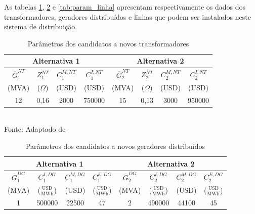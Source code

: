 As tabelas \ref{tab:param_trafo}, \ref{tab:param_dg} e \ref{tab:param_linha} apresentam respectivamente os dados dos transformadores, geradores distribuídos e linhas que podem ser instalados neste sistema de distribuição.
\begin{table}[ht]
\centering
\caption{Parâmetros dos candidatos a novos transformadores}
\label{tab:param_trafo}
\begin{tabular}{@{}cccccccc@{}}
\toprule
\multicolumn{4}{c}{Alternativa 1} & \multicolumn{4}{c}{Alternativa 2} \\ \midrule
$\overline{G}^{NT}_1$ & $Z^{NT}_1$ & $C^{M,NT}_1$ & $C^{I,NT}_1$ & $\overline{G}^{NT}_2$ & $Z^{NT}_2$ & $C^{M,NT}_2$ & $C^{I,NT}_2$ \\
(MVA)  & ($\Omega$)  & (USD) & (USD)   & (MVA)  & ($\Omega$)  & (USD) & (USD)   \\ \midrule
12     & 0,16     & 2000 & 750000 & 15     & 0,13     & 3000 & 950000 \\ \bottomrule
\end{tabular}
\\Fonte: Adaptado de 
\end{table}
\begin{table}[ht]
\centering
\caption{Parâmetros dos candidatos a novos geradores distribuídos}
\label{tab:param_dg}
\begin{tabular}{@{}cccccccc@{}}
\toprule
\multicolumn{4}{c}{Alternativa 1}     & \multicolumn{4}{c}{Alternativa 2}     \\ \midrule
$\overline{G}^{DG}_1$ & $C^{I,DG}_1$ & $C^{M,DG}_1$ & $C^{E,DG}_1$ & $\overline{G}^{DG}_2$ & $C^{I,DG}_2$ & $C^{M,DG}_2$ & $C^{E,DG}_2$ \\
(MVA) & ($\frac{\text{USD}}{\text{MWh}}$) & (USD) & ($\frac{\text{USD}}{\text{MWh}}$) & (MVA) & ($\frac{\text{USD}}{\text{MWh}}$)& (USD) & ($\frac{\text{USD}}{\text{MWh}}$) \\ \midrule
1     & 500000    & 22500 & 47        & 2     & 490000    & 44100 & 45        \\ \bottomrule
\end{tabular}
\end{table}
